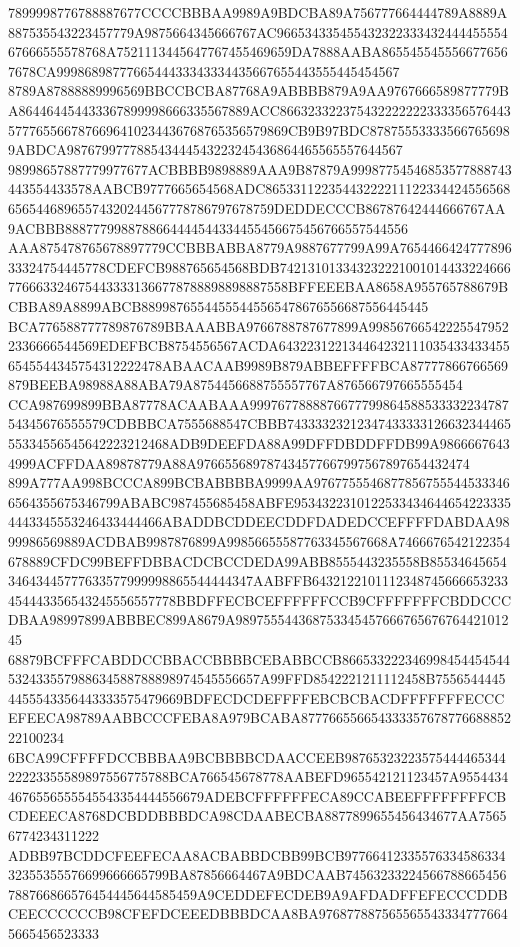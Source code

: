 7899998776788887677CCCCBBBAA9989A9BDCBA89A756777664444789A8889A887535543223457779A9875664345666767AC96653433545543232233343244445555467666555578768A7521113445647767455469659DA7888AABA8655455455566776567678CA9998689877766544433343334435667655443555445454567
8789A87888889996569BBCCBCBA87768A9ABBBB879A9AA9767666589877779BA864464454433367899998666335567889ACC8663233223754322222223333565764435777655667876696410234436768765356579869CB9B97BDC878755533335667656989ABDCA987679977788543444543223245436864465565557644567
98998657887779977677ACBBBB9898889AAA9B87879A99987754546853577888743443554433578AABCB9777665654568ADC8653311223544322221112233442455656865654468965574320244567778786797678759DEDDECCCB86787642444666767AA9ACBBB8887779988788664444544334455456675456766557544556
AAA875478765678897779CCBBBABBA8779A9887677799A99A765446642477789633324754445778CDEFCB988765654568BDB7421310133432322210010144332246667766633246754433331366778788898898887558BFFEEEBAA8658A955765788679BCBBA89A8899ABCB88998765544555445565478676556687556445445
BCA776588777789876789BBAAABBA9766788787677899A998567665422255479522336666544569EDEFBCB8754556567ACDA6432231221344642321110354334334556545544345754312222478ABAACAAB9989B879ABBEFFFFBCA87777866766569879BEEBA98988A88ABA79A8754456688755557767A876566797665555454
CCA987699899BBA87778ACAABAAA999767788887667779986458853333223478754345676555579CDBBBCA7555688547CBBB7433332321234743333312663234446555334556545642223212468ADB9DEEFDA88A99DFFDBDDFFDB99A98666676434999ACFFDAA89878779A88A976655689787434577667997567897654432474
899A777AA998BCCCA899BCBABBBBA9999AA97677555468778567555445333466564355675346799ABABC987455685458ABFE95343223101225334346446542233354443345553246433444466ABADDBCDDEECDDFDADEDCCEFFFFDABDAA9899986569889ACDBAB9987876899A99856655587763345567668A7466676542122354
678889CFDC99BEFFDBBACDCBCCDEDA99ABB8555443235558B8553464565434643445777633577999998865544444347AABFFB6432122101112348745666653233454443356543245556557778BBDFFECBCEFFFFFFCCB9CFFFFFFFCBDDCCCDBAA98997899ABBBEC899A8679A98975554436875334545766676567676442101245
68879BCFFFCABDDCCBBACCBBBBCEBABBCCB866533222346998454454544532433557988634588788898974545556657A99FFD8542221211112458B75565444454455543356443333575479669BDFECDCDEFFFFEBCBCBACDFFFFFFFECCCEFEECA98789AABBCCCFEBA8A979BCABA87776655665433335767877668885222100234
6BCA99CFFFFDCCBBBAA9BCBBBBCDAACCEEB9876532322357544446534422223355589897556775788BCA766545678778AABEFD965542121123457A95544344676556555545543354444556679ADEBCFFFFFFECA89CCABEEFFFFFFFFCBCDEEECA8768DCBDDBBBDCA98CDAABECBA8877899655456434677AA75656774234311222
ADBB97BCDDCFEEFECAA8ACBABBDCBB99BCB9776641233557633458633432355355576699666665799BA87856664467A9BDCAAB74563233224566788665456788766866576454445644585459A9CEDDEFECDEB9A9AFDADFFEFECCCDDBCEECCCCCCB98CFEFDCEEEDBBBDCAA8BA9768778875655655433347776645665456523333
